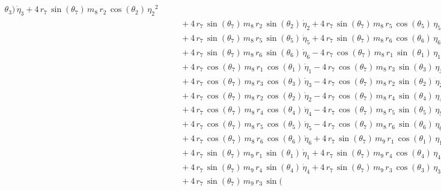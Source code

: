 \begin{eqnarray*}
{\theta_{3}})\,{\dot{\eta}_{3}} + 4\,r_{7}\,\sin({\theta_{7}})\,m_{8}
\,r_{2}\,\cos({\theta_{2}})\,{{\eta_{2}}}^2 \\ &&\quad\mbox{} + 4\,r_{
7}\,\sin({\theta_{7}})\,m_{8}\,r_{2}\,\sin({\theta_{2}})\,{\dot{\eta}
_{2}} + 4\,r_{7}\,\sin({\theta_{7}})\,m_{8}\,r_{5}\,\cos({\theta_{5}})
\,{{\eta_{5}}}^2 \\ &&\quad\mbox{} + 4\,r_{7}\,\sin({\theta_{7}})\,m_{
8}\,r_{5}\,\sin({\theta_{5}})\,{\dot{\eta}_{5}} + 4\,r_{7}\,\sin({
\theta_{7}})\,m_{8}\,r_{6}\,\cos({\theta_{6}})\,{{\eta_{6}}}^2
 \\ &&\quad\mbox{} + 4\,r_{7}\,\sin({\theta_{7}})\,m_{8}\,r_{6}\,\sin(
{\theta_{6}})\,{\dot{\eta}_{6}} - 4\,r_{7}\,\cos({\theta_{7}})\,m_{8}
\,r_{1}\,\sin({\theta_{1}})\,{{\eta_{1}}}^2 \\ &&\quad\mbox{} + 4\,r_{
7}\,\cos({\theta_{7}})\,m_{8}\,r_{1}\,\cos({\theta_{1}})\,{\dot{\eta}
_{1}} - 4\,r_{7}\,\cos({\theta_{7}})\,m_{8}\,r_{3}\,\sin({\theta_{3}})
\,{{\eta_{3}}}^2 \\ &&\quad\mbox{} + 4\,r_{7}\,\cos({\theta_{7}})\,m_{
8}\,r_{3}\,\cos({\theta_{3}})\,{\dot{\eta}_{3}} - 4\,r_{7}\,\cos({
\theta_{7}})\,m_{8}\,r_{2}\,\sin({\theta_{2}})\,{{\eta_{2}}}^2
 \\ &&\quad\mbox{} + 4\,r_{7}\,\cos({\theta_{7}})\,m_{8}\,r_{2}\,\cos(
{\theta_{2}})\,{\dot{\eta}_{2}} - 4\,r_{7}\,\cos({\theta_{7}})\,m_{8}
\,r_{4}\,\sin({\theta_{4}})\,{{\eta_{4}}}^2 \\ &&\quad\mbox{} + 4\,r_{
7}\,\cos({\theta_{7}})\,m_{8}\,r_{4}\,\cos({\theta_{4}})\,{\dot{\eta}
_{4}} - 4\,r_{7}\,\cos({\theta_{7}})\,m_{8}\,r_{5}\,\sin({\theta_{5}})
\,{{\eta_{5}}}^2 \\ &&\quad\mbox{} + 4\,r_{7}\,\cos({\theta_{7}})\,m_{
8}\,r_{5}\,\cos({\theta_{5}})\,{\dot{\eta}_{5}} - 4\,r_{7}\,\cos({
\theta_{7}})\,m_{8}\,r_{6}\,\sin({\theta_{6}})\,{{\eta_{6}}}^2
 \\ &&\quad\mbox{} + 4\,r_{7}\,\cos({\theta_{7}})\,m_{8}\,r_{6}\,\cos(
{\theta_{6}})\,{\dot{\eta}_{6}} + 4\,r_{7}\,\sin({\theta_{7}})\,m_{9}
\,r_{1}\,\cos({\theta_{1}})\,{{\eta_{1}}}^2 \\ &&\quad\mbox{} + 4\,r_{
7}\,\sin({\theta_{7}})\,m_{9}\,r_{1}\,\sin({\theta_{1}})\,{\dot{\eta}
_{1}} + 4\,r_{7}\,\sin({\theta_{7}})\,m_{9}\,r_{4}\,\cos({\theta_{4}})
\,{{\eta_{4}}}^2 \\ &&\quad\mbox{} + 4\,r_{7}\,\sin({\theta_{7}})\,m_{
9}\,r_{4}\,\sin({\theta_{4}})\,{\dot{\eta}_{4}} + 4\,r_{7}\,\sin({
\theta_{7}})\,m_{9}\,r_{3}\,\cos({\theta_{3}})\,{{\eta_{3}}}^2
 \\ &&\quad\mbox{} + 4\,r_{7}\,\sin({\theta_{7}})\,m_{9}\,r_{3}\,\sin(

\end{eqnarray*}
